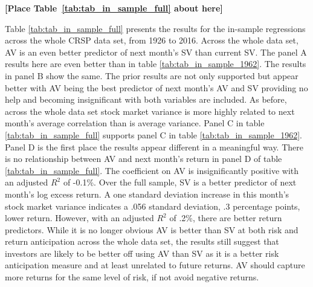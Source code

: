 \bigskip
\centerline{\bf [Place Table~\ref{tab:tab_in_sample_full} about here]}
\bigskip

Table \ref{tab:tab_in_sample_full} presents the results for the in-sample regressions across the whole CRSP data set, from 1926 to 2016. Across the whole data set, AV is an even better predictor of next month’s SV than current SV. The panel A results here are even better than in table \ref{tab:tab_in_sample_1962}. The results in panel B show the same. The prior results are not only supported but appear better with AV being the best predictor of next month’s AV and SV providing no help and becoming insignificant with both variables are included. As before, across the whole data set stock market variance is more highly related to next month’s average correlation than is average variance. Panel C in table \ref{tab:tab_in_sample_full} supports panel C in table \ref{tab:tab_in_sample_1962}. Panel D is the first place the results appear different in a meaningful way. There is no relationship between AV and next month’s return in panel D of table \ref{tab:tab_in_sample_full}. The coefficient on AV is insignificantly positive with an adjusted $R^{2}$ of -0.1\%. Over the full sample, SV is a better predictor of next month's log excess return. A one standard deviation increase in this month's stock market variance indicates a .056 standard deviation, .3 percentage points, lower return. However, with an adjusted $R^{2}$ of .2\%, there are better return predictors. While it is no longer obvious AV is better
than SV at both risk and return anticipation across the whole data set, the results still suggest that investors are likely to be better off using AV than SV as it is a better risk anticipation measure and at least unrelated to future returns. AV should capture more returns for the same level of risk, if
not avoid negative returns.